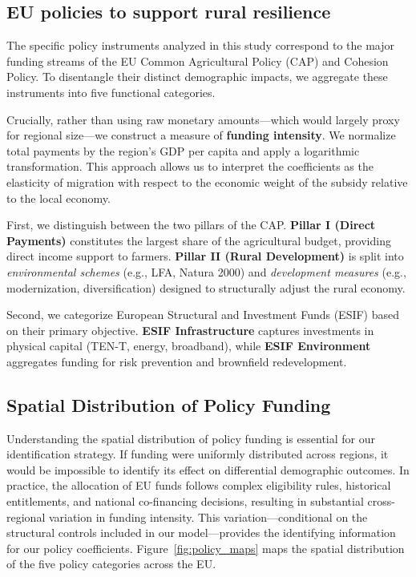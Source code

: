 \documentclass[
	a4paper, %
	10pt, %
]{LTJournalArticle}
\begin{document}
\subsection{EU policies to support rural resilience}
The specific policy instruments analyzed in this study correspond to the major funding streams of the EU Common Agricultural Policy (CAP) and Cohesion Policy. To disentangle their distinct demographic impacts, we aggregate these instruments into five functional categories.

Crucially, rather than using raw monetary amounts—which would largely proxy for regional size—we construct a measure of \textbf{funding intensity}. We normalize total payments by the region's GDP per capita and apply a logarithmic transformation. This approach allows us to interpret the coefficients as the elasticity of migration with respect to the economic weight of the subsidy relative to the local economy.

First, we distinguish between the two pillars of the CAP. \textbf{Pillar I (Direct Payments)} constitutes the largest share of the agricultural budget, providing direct income support to farmers. \textbf{Pillar II (Rural Development)} is split into \textit{environmental schemes} (e.g., LFA, Natura 2000) and \textit{development measures} (e.g., modernization, diversification) designed to structurally adjust the rural economy.

Second, we categorize European Structural and Investment Funds (ESIF) based on their primary objective. \textbf{ESIF Infrastructure} captures investments in physical capital (TEN-T, energy, broadband), while \textbf{ESIF Environment} aggregates funding for risk prevention and brownfield redevelopment.

\subsection{Spatial Distribution of Policy Funding}

Understanding the spatial distribution of policy funding is essential for our identification strategy. If funding were uniformly distributed across regions, it would be impossible to identify its effect on differential demographic outcomes. In practice, the allocation of EU funds follows complex eligibility rules, historical entitlements, and national co-financing decisions, resulting in substantial cross-regional variation in funding intensity. This variation—conditional on the structural controls included in our model—provides the identifying information for our policy coefficients. Figure~\ref{fig:policy_maps} maps the spatial distribution of the five policy categories across the EU.
\end{document}
